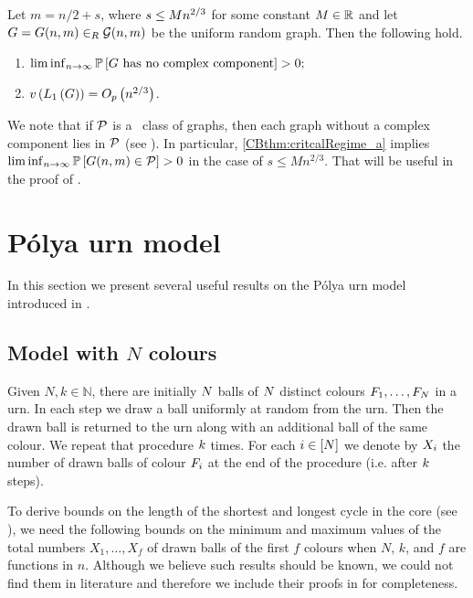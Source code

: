 \begin{thm}\label{CBthm:critcalRegime}
	Let $m=n/2+s$, where $s\leq M n^{2/3}$ for some constant $M \in \mathbb{R}$ and let $G=G(n,m)\in_R \mathcal G(n,m)$ be the uniform random graph. Then the following hold. 
	\begin{enumerate}
		\item \label{CBthm:critcalRegime_a}
		$
		\liminf_{n \to \infty} \mathbb{P}\left[G \text{ has no complex component}\right]>0;
		$
		\item \label{CBthm:critcalRegime_b}
		$v\left({L_1\left(G\right)}\right)=O_p\left(n^{2/3}\right)$.
	\end{enumerate}
\end{thm}
We note that if $\mathcal{P}$ is a \pl\ class of graphs, then each graph without a complex component lies in $\mathcal{P}$ (see ). In particular, \ref{CBthm:critcalRegime_a} implies $\liminf_{n \to \infty} \mathbb{P}\left[G(n,m) \in \mathcal{P}\right]>0$ in the case of $s\leq Mn^{2/3}$. That will be useful in the proof of .

\section{P\'olya urn model}\label{CBsec:polya}
In this section we present several useful results on the P\'olya urn model introduced in . 

\subsection{Model with \texorpdfstring{$N$}{N} colours}
Given $N,k\in \mathbb N$, there are initially $N$ balls of $N$ distinct colours $F_1, \ldots, F_{N}$ in a urn. In each step we draw a ball uniformly at random from the urn. Then the drawn ball is returned to the urn along with an additional ball of the same colour. We repeat that procedure $k$ times. For each $i\in [N]$ we denote by $X_i$ the number of drawn balls of colour $F_i$ at the end of the procedure (i.e. after $k$ steps).

To derive bounds on the length of the shortest and longest cycle in the core (see ), we need the following bounds on the minimum and maximum values of the total numbers $X_1, \ldots, X_{f}$ of drawn balls of the first $f$ colours when $N$, $k$, and $f$ are functions in $n$. Although we believe such results should be known, we could not find them in literature and therefore we include their proofs in  for completeness.
 
